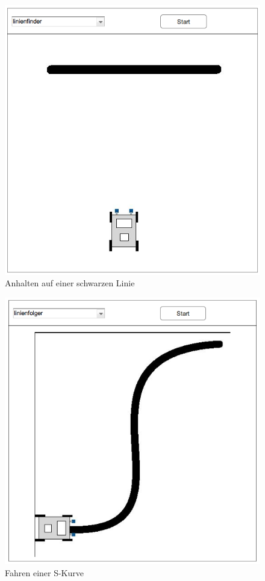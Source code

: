 \documentclass[paper=a4, DIV=calc, BCOR=12mm, twoside=on, onecolumn=on, open = right, titlepage =on, parskip =half-, headsepline = on, footsepline = off, chapterprefix = off, appendixprefix = on, fontsize = 12pt, numbers = noenddot, abstract = on]{scrbook}
\begin{document}
\begin{figure}[htb]
\centering
\includegraphics[scale=0.5]{images/mockup_linienfinder.png}
\caption{Anhalten auf einer schwarzen Linie}
\label{fig:linienfinder}
\end{figure}


\begin{figure}[htb]
\centering
\includegraphics[scale=0.5]{images/mockup_linienfolger.png}
\caption{Fahren einer S-Kurve}
\label{fig:linienfolger}
\end{figure}
\vfill
\end{document}

